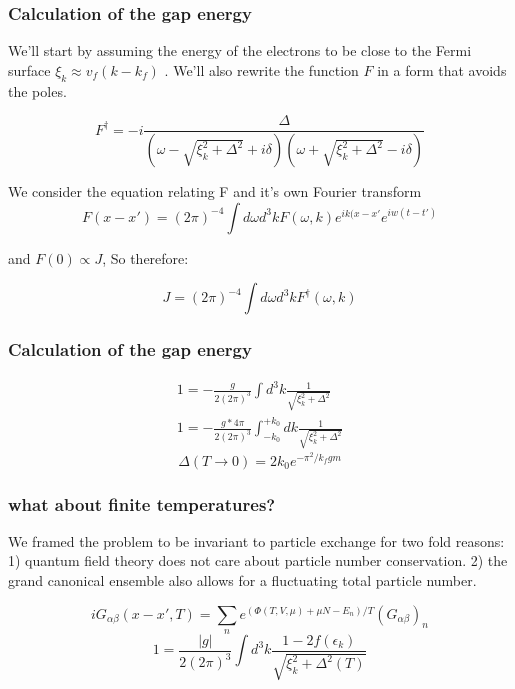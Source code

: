 \documentclass{beamer}
\begin{document}
\begin{frame}
\frametitle{Calculation of the gap energy}
We'll start by assuming the energy of the electrons to be close to the Fermi surface $\xi_k \approx v_f(k - k_f)$ .
We'll also rewrite the function $F$ in a form that avoids the poles.

\begin{equation*}
F^{\dagger} = -i\frac{\Delta}{(\omega - \sqrt{\xi_k^2 + \Delta^2} + i\delta)(\omega + \sqrt{\xi_k^2 + \Delta^2} - i\delta)}
\end{equation*}



We consider the equation relating F and it's own Fourier transform
\begin{equation*}
F(x-x') = (2\pi)^{-4}\int d\omega d^3 k F(\omega, k) e^{ik(x-x'}e^{iw(t-t')}
\end{equation*}

and $F(0) \propto J$,
So therefore:

\begin{equation*}
J = (2\pi)^{-4}\int d\omega d^3 k F^{\dagger}(\omega, k)
\end{equation*}
\end{frame}


\begin{frame}
\frametitle{Calculation of the gap energy}
\begin{eqnarray*}
1= -\frac{g}{2(2\pi)^3}\int d^3 k \frac{1}{\sqrt{\xi_k^2 + \Delta^2}} \\
1 = -\frac{g*4\pi}{2(2\pi)^3}\int_{-k_0}^{+k_0} dk \frac{1}{\sqrt{\xi_k^2 + \Delta^2}} 
\end{eqnarray*}
\begin{equation*}
\Delta(T\rightarrow 0) = 2k_0e^{-\pi^2 / k_f g m}
\end{equation*}

\end{frame}


\begin{frame}
\frametitle{what about finite temperatures?}
We framed the problem to be invariant to particle exchange for two fold reasons: 1) quantum field theory does not care about particle number conservation. 2) the grand canonical ensemble also allows for a fluctuating total particle number. 

\begin{equation*}
iG_{\alpha\beta}(x-x', T) = \sum_ne^{(\Phi (T,V,\mu) +\mu N - E_n)/T}(G_{\alpha\beta})_n
\end{equation*}
\begin{equation*}
1 = \frac{|g|}{2 (2\pi)^3}\int d^3 k \frac{1-2f(\epsilon_k)}{\sqrt{\xi_k^2+\Delta^2 (T)}}
\end{equation*}

\end{frame}
\end{document}
